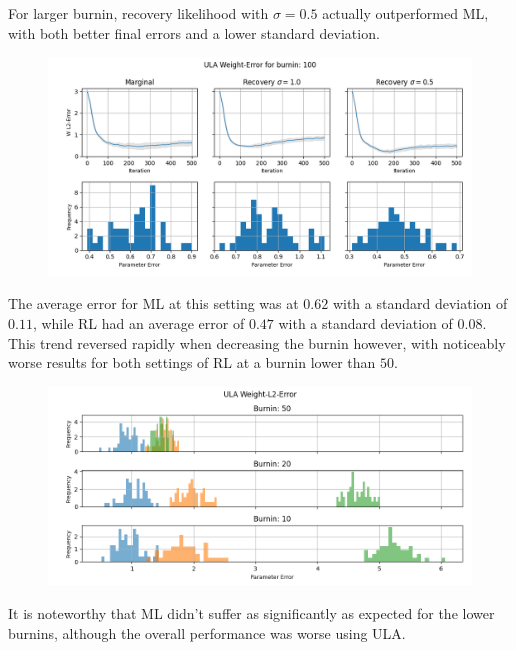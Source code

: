 For larger burnin, recovery likelihood with $\sigma = 0.5$ actually outperformed ML, with both better final errors and a lower standard deviation.
\begin{figure}[H]
  	\centering
  	\includegraphics[width=0.85\linewidth]{assets/figures/POLY_ULA_burnin100.png}
\end{figure}

The average error for ML at this setting was at $0.62$ with a standard deviation of $0.11$, 
while RL had an average error of $0.47$ with a standard deviation of $0.08$.
This trend reversed rapidly when decreasing the burnin however, with noticeably worse results for both settings of RL at a burnin lower than $50$.
\begin{figure}[H]
  	\centering
  	\includegraphics[width=0.85\linewidth]{assets/figures/POLY_ULA_burnins.png}
\end{figure}

It is noteworthy that ML didn't suffer as significantly as expected for the lower burnins, although the overall performance was worse using ULA.


